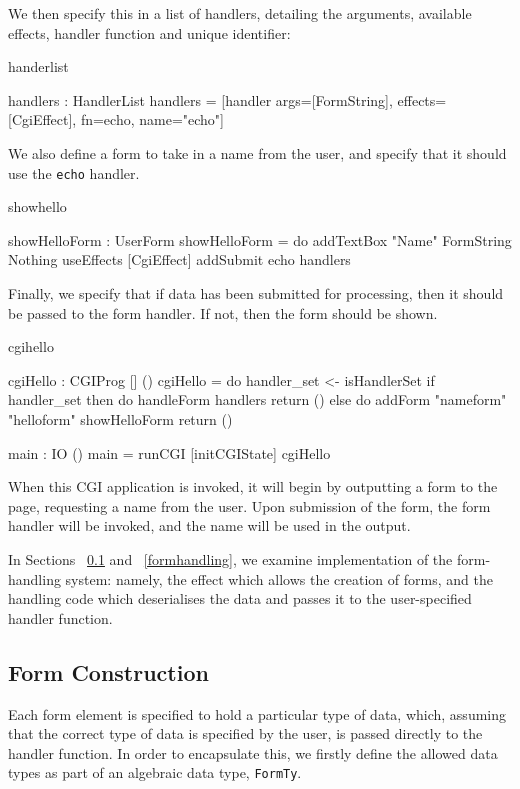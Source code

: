 \noindent
We then specify this in a list of handlers, detailing the arguments, available effects, handler function and unique identifier:

\begin{SaveVerbatim}{handerlist}

handlers : HandlerList
handlers = [handler args=[FormString], 
                    effects=[CgiEffect], 
                    fn=echo, 
                    name="echo"]

\end{SaveVerbatim}

\noindent
We also define a form to take in a name from the user, and specify that it
should use the \texttt{echo} handler.

\begin{SaveVerbatim}{showhello}

showHelloForm : UserForm
showHelloForm = do
  addTextBox "Name" FormString Nothing
  useEffects [CgiEffect]
  addSubmit echo handlers

\end{SaveVerbatim}

\noindent
Finally, we specify that if data has been submitted for processing, then it
should be passed to the form handler. If not, then the form should be shown.

\begin{SaveVerbatim}{cgihello}

cgiHello : CGIProg [] ()
cgiHello = do
  handler_set <- isHandlerSet
  if handler_set then do
    handleForm handlers
    return ()
  else do
    addForm "nameform" "helloform" showHelloForm
    return ()

main : IO ()
main = runCGI [initCGIState] cgiHello

\end{SaveVerbatim}

\noindent
When this CGI application is invoked, it will begin by outputting a form to the
page, requesting a name from the user. Upon submission of the form, the form
handler will be invoked, and the name will be used in the output.

In Sections ~\ref{formcons} and ~\ref{formhandling}, we examine implementation
of the form-handling system: namely, the effect which allows the creation of
forms, and the handling code which deserialises the data and passes it to the
user-specified handler function.  

\subsection{Form Construction}
\label{formcons}
Each form element is specified  to hold a particular type of data, which, assuming that the correct type of data is specified by the user, is passed directly to the handler function. In order to encapsulate this, we firstly define the allowed data types as part of an algebraic data type, \texttt{FormTy}.

